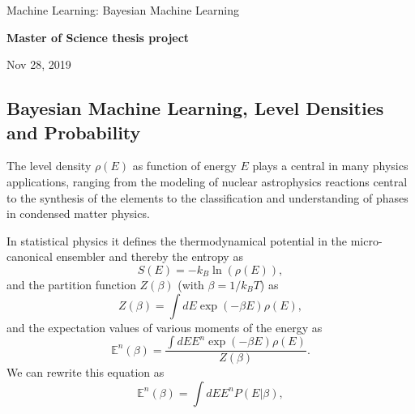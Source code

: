 \documentclass[%
oneside,                 %
final,                   %
10pt]{article}
\begin{document}

\newcommand{\exercisesection}[1]{\subsection*{#1}}






\thispagestyle{empty}

\begin{center}
{\LARGE\bf
\begin{spacing}{1.25}
Machine Learning: Bayesian Machine Learning
\end{spacing}
}
\end{center}


\begin{center}
{\bf Master of Science thesis project${}^{}$} \\ [0mm]
\end{center}

\begin{center}
\end{center}
    

\begin{center}
Nov 28, 2019
\end{center}

\vspace{1cm}


\subsection*{Bayesian Machine Learning, Level Densities and Probability}

The level density $\rho(E)$ as function of energy $E$ plays a central in many
physics applications, ranging from the modeling of nuclear
astrophysics reactions central to the synthesis of the elements to the
classification and understanding of phases in condensed matter
physics.

In statistical physics it defines the thermodynamical potential in the micro-canonical ensembler and thereby the entropy as
\[
S(E) = -k_B \ln{(\rho(E))},
\]
and the partition function $Z(\beta)$ (with $\beta = 1/k_BT$)  as
\[
Z(\beta) = \int dE \exp{(-\beta E)}\rho(E),
\]
and the expectation values of various moments of the energy
as
\[
\mathbb{E}^n(\beta) = \frac{\int dE E^n\exp{(-\beta E)}\rho(E)}{Z(\beta)}. 
\]
We can rewrite this equation as
\[
\mathbb{E}^n(\beta) = \int dE E^n P(E\vert\beta), 
\]
\end{document}
